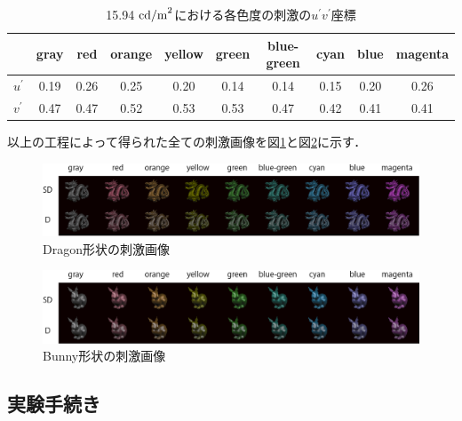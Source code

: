                 \begin{table}[h]
                    \centering
                    \caption{15.94 ${\rm cd/m}^2$における各色度の刺激の$u^{\prime}v^{\prime}$座標}
                    \begin{tabular}{|l||c|c|c|c|c|c|c|c|c|} \hline
                                      & gray   & red    & orange & yellow & green  & blue-green & cyan   & blue   & magenta \\ \hline \hline
                        $u^{\prime}$  & 0.19 & 0.26 & 0.25 & 0.20 & 0.14 & 0.14     & 0.15 & 0.20 & 0.26  \\ \hline
                        $v^{\prime}$  & 0.47 & 0.47 & 0.52 & 0.53 & 0.53 & 0.47     & 0.42 & 0.41 & 0.41  \\ \hline
                    \end{tabular}
                    \label{uvyTable}
                \end{table}

                
            以上の工程によって得られた全ての刺激画像を図\ref{ex1_stimuli_d}と図\ref{ex1_stimuli_b}に示す．

            \begin{figure}[h]
                \centering
                \includegraphics[width=14.0cm]{./img/ex1_stimuli_d_p.png}
                \caption{Dragon形状の刺激画像}
                \label{ex1_stimuli_d}
            \end{figure}

            \begin{figure}[h]
                \centering
                \includegraphics[width=14.0cm]{./img/ex1_stimuli_b_p.png}
                \caption{Bunny形状の刺激画像}
                \label{ex1_stimuli_b}
            \end{figure}

        \newpage
        \subsection{実験手続き}

